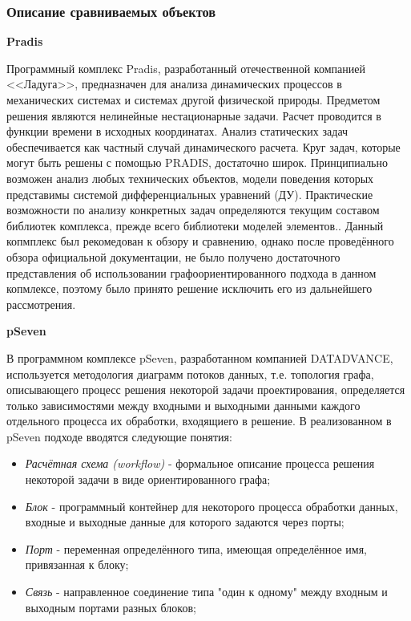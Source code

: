 \subsubsection{Описание сравниваемых объектов}
\textbf{Pradis}

Программный комплекс Pradis, разработанный отечественной компанией <<Ладуга>>, предназначен для анализа динамических процессов в механических системах и системах другой физической природы. Предметом решения являются  нелинейные нестационарные задачи. Расчет проводится в функции времени в исходных координатах. Анализ статических задач обеспечивается как частный случай динамического расчета. Круг задач, которые могут быть решены с помощью PRADIS, достаточно широк. Принципиально возможен анализ любых технических объектов, модели поведения которых представимы системой дифференциальных уравнений (ДУ). Практические возможности по анализу конкретных задач определяются текущим составом библиотек комплекса, прежде всего библиотеки моделей элементов.\cite{PradisGeneral2007}. Данный копмплекс был рекомедован к обзору и сравнению, однако после проведённого обзора официальной документации\cite{PradisMethods2007}, не было получено достаточного представления об использовании графоориентированного подхода в данном копмлексе, поэтому было принято решение исключить его из дальнейшего рассмотрения.

\textbf{pSeven}

В программном комплексе pSeven, разработанном компанией DATADVANCE, используется методология диаграмм потоков данных, т.е. топология графа, описывающего процесс решения некоторой задачи проектирования, определяется только зависимостями между входными и выходными данными каждого отдельного процесса их обработки, входящиего в решение. \cite{Nazarenko2015} В реализованном в pSeven подходе вводятся следующие понятия:
\begin{itemize}
    \item \emph{Расчётная схема (workflow)} - формальное описание процесса решения некоторой задачи в виде ориентированного графа;
    \item \emph{Блок} - программный контейнер для некоторого процесса обработки данных, входные и выходные данные для которого задаются через порты;
    \item \emph{Порт} - переменная определённого типа, имеющая определённое имя, привязанная к блоку;
    \item \emph{Связь} - направленное соединение типа "один к одному" между входным и выходным портами разных блоков;
\end{itemize}

